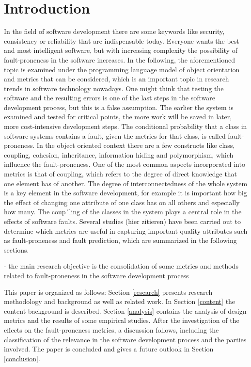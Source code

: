 \section{Introduction}

In the field of software development there are some keywords like security, consistency or reliability that are indispensable today. Everyone wants the best and most intelligent software, but with increasing complexity the possibility of fault-proneness in the software increases. In the following, the aforementioned topic is examined under the programming language model of object orientation and metrics that can be considered, which is an important topic in research trends in software technology nowadays.
One might think that testing the software and the resulting errors is one of the last steps in the software development process, but this is a false assumption. The earlier the system is examined and tested for critical points, the more work will be saved in later, more cost-intensive development steps.
The conditional probability that a class in software systems contains a fault, given the metrics for that class, is called fault-proneness.
In the object oriented context there are a few constructs like class, coupling, cohesion, inheritance, information hiding and polymorphism, which influence the fault-proneness. 
One of the most common aspects incorporated into metrics is that of coupling, which refers to the degree of direct knowledge that one element has of another. The degree of interconnectedness of the whole system is a key element in the software development, for example it is important how big the effect of changing one attribute of one class has on all others and especially how many.
The coup´ling of the classes in the system plays a central role in the effects of software faults.
Several studies (hier zitieren) have been carried out to determine which metrics are useful in capturing important quality attributes such as fault-proneness  and fault prediction, which are summarized in the following sections.

- the main research objective is the consolidation of some metrics and methods related to fault-proneness in the software development process


This paper is organized as follows: Section \ref{research} presents research methodology and background as well as related work. In Section \ref{content} the content background is described. Section \ref{analysis} contains the analysis of design metrics and the results of some empirical studies. After the investigation of the effects on the fault-proneness metrics, a discussion follows, including the classification of the relevance in the software development process and the parties involved. The paper is concluded and gives a future outlook in Section \ref{conclusion}.